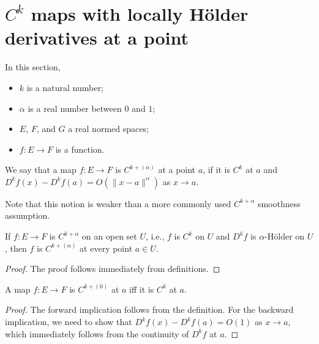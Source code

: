 \section{\(C^{k}\) maps with locally Hölder derivatives at a point}%
\label{sec:cdh-at}

In this section,
\begin{itemize}
\item \(k\) is a natural number;
\item \(\alpha\) is a real number between \(0\) and \(1\);
\item \(E\), \(F\), and \(G\) a real normed spaces;
\item \(f\colon E \to F\) is a function.
\end{itemize}

\begin{definition}%
  \label{def:cdh-at}
  \leanok%
  We say that a map \(f\colon E\to F\) is \emph{\(C^{k+(\alpha)}\)} at a point \(a\),
  if it is \(C^{k}\) at \(a\) and \(D^{k}f(x) - D^{k}f(a) = O(\|x - a\|^{\alpha})\) as \(x\to a\).
\end{definition}

Note that this notion is weaker than a more commonly used \(C^{k+\alpha}\) smoothness assumption.
\begin{lemma}%
  \label{def:contdiffholder-imp-cdh-at}
  \leanok%
  If \(f\colon E \to F\) is \(C^{k+\alpha}\) on an open set \(U\),
  i.e., \(f\) is \(C^{k}\) on \(U\) and \(D^{k}f\) is \(\alpha\)-Hölder on \(U\),
  then \(f\) is \(C^{k+(\alpha)}\) at every point \(a \in U\).
\end{lemma}
\begin{proof}
  \leanok%
  The proof follows immediately from definitions.
\end{proof}

\begin{lemma}%
  \label{lem:cdh-at-zero}
  \leanok%
  A map \(f\colon E\to F\) is \(C^{k+(0)}\) at \(a\) iff it is \(C^{k}\) at \(a\).
\end{lemma}

\begin{proof}
  \leanok%
  The forward implication follows from the definition.
  For the backward implication,
  we need to show that \(D^{k}f(x) - D^{k}f(a)=O(1)\) as \(x\to a\),
  which immediately follows from the continuity of \(D^{k}f\) at \(a\).
\end{proof}

